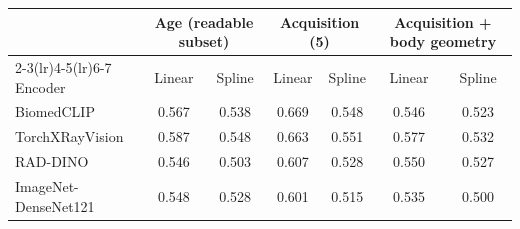 \begin{tabular}{lcccccc}
\toprule
& \multicolumn{2}{c}{Age (readable subset)} & \multicolumn{2}{c}{Acquisition (5)} & \multicolumn{2}{c}{Acquisition + body geometry} \\
\cmidrule(lr){2-3}\cmidrule(lr){4-5}\cmidrule(lr){6-7}
Encoder & Linear & Spline & Linear & Spline & Linear & Spline \\
\midrule
BiomedCLIP & 0.567 & 0.538 & 0.669 & 0.548 & 0.546 & 0.523 \\
TorchXRayVision & 0.587 & 0.548 & 0.663 & 0.551 & 0.577 & 0.532 \\
RAD-DINO & 0.546 & 0.503 & 0.607 & 0.528 & 0.550 & 0.527 \\
ImageNet-DenseNet121 & 0.548 & 0.528 & 0.601 & 0.515 & 0.535 & 0.500 \\
\bottomrule
\end{tabular}

